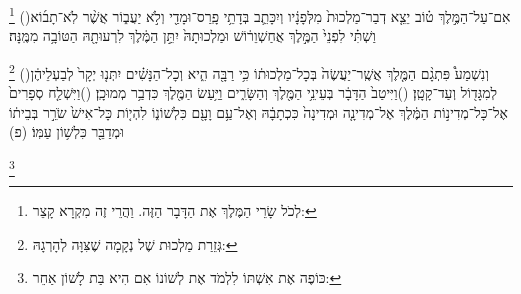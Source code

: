 \documentclass[12pt, openany]{book}
\newcommand{\footnotecomment}[1]{
	\renewcommand\thefootnote{}
	\footnote{\textsf{#1}}}
\newcommand{\commenta}[1]{\footnotecomment{#1}\hspace{0em}}
\newcommand{\vsnum}[1]{(\hebrewnumeral{#1})\space}
\begin{document}
\begin{multicols}{2}
\commenta{ לְכֹל שָׂרֵי הַמֶּלֶךְ אֶת הַדָּבָר הַזֶּה. וַהֲרֵי זֶה מִקְרָא קָצֵר:}%
\vsnum{19}אִם־עַל־הַמֶּ֣לֶךְ ט֗וֹב יֵצֵ֤א דְבַר־מַלְכוּת֙ מִלְּפָנָ֔יו וְיִכָּתֵ֛ב בְּדָתֵ֥י פָֽרַס־וּמָדַ֖י וְלֹ֣א יַעֲב֑וֹר אֲשֶׁ֨ר לֹֽא־תָב֜וֹא וַשְׁתִּ֗י לִפְנֵי֙ הַמֶּ֣לֶךְ אֲחַשְׁוֵר֔וֹשׁ וּמַלְכוּתָהּ֙ יִתֵּ֣ן הַמֶּ֔לֶךְ לִרְעוּתָ֖הּ הַטּוֹבָ֥ה מִמֶּֽנָּה׃%
\commenta{ גְּזֵרַת מַלְכוּת שֶׁל נְקָמָה שֶׁצִּוָּה לְהָרְגָהּ:}%
\vsnum{20}וְנִשְׁמַע֩ פִּתְגָ֨ם הַמֶּ֤לֶךְ אֲשֶֽׁר־יַעֲשֶׂה֙ בְּכָל־מַלְכוּת֔וֹ כִּ֥י רַבָּ֖ה הִ֑יא וְכָל־הַנָּשִׁ֗ים יִתְּנ֤וּ יְקָר֙ לְבַעְלֵיהֶ֔ן לְמִגָּד֖וֹל וְעַד־קָטָֽן׃
\vsnum{21}וַיִּיטַב֙ הַדָּבָ֔ר בְּעֵינֵ֥י הַמֶּ֖לֶךְ וְהַשָּׂרִ֑ים וַיַּ֥עַשׂ הַמֶּ֖לֶךְ כִּדְבַ֥ר מְמוּכָֽן׃
\vsnum{22}וַיִּשְׁלַ֤ח סְפָרִים֙ אֶל־כָּל־מְדִינ֣וֹת הַמֶּ֔לֶךְ אֶל־מְדִינָ֤ה וּמְדִינָה֙ כִּכְתָבָ֔הּ וְאֶל־עַ֥ם וָעָ֖ם כִּלְשׁוֹנ֑וֹ לִהְי֤וֹת כָּל־אִישׁ֙ שֹׂרֵ֣ר בְּבֵית֔וֹ וּמְדַבֵּ֖ר כִּלְשׁ֥וֹן עַמּֽוֹ׃ (פ)%
\commenta{ כּוֹפֶה אֶת אִשְׁתּוֹ לִלְמֹד אֶת לְשׁוֹנוֹ אִם הִיא בַּת לָשׁוֹן אַחֵר:}%
\end{multicols}\newpage
\end{document}
